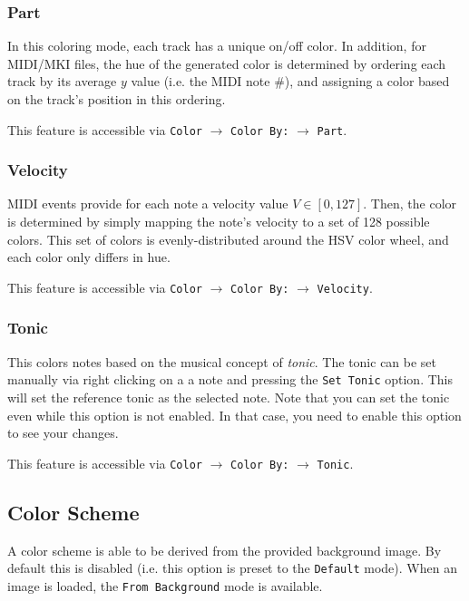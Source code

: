 \documentclass[english]{article}
\providecommand{\mi}[1]{\texttt{#1}}
\begin{document}
\vspace{1em}

\subsubsection{Part}

In this coloring mode, each track has a unique on/off color. In addition, for MIDI/MKI files, the hue of the generated
color is determined by ordering each track by its average $y$ value (i.e. the MIDI note \#), and assigning
a color based on the track's position in this ordering.

This feature is accessible via 
\mi{Color} $\rightarrow$ \mi{Color By:} $\rightarrow$ \mi{Part}.

\subsubsection{Velocity}

MIDI events provide for each note a velocity value $V \in [0, 127]$. Then, the color is determined by simply mapping 
the note's velocity to a set of 128 possible colors. This set of colors is evenly-distributed around
the HSV color wheel, and each color only differs in hue.

This feature is accessible via 
\mi{Color} $\rightarrow$ \mi{Color By:} $\rightarrow$ \mi{Velocity}.

\subsubsection{Tonic}

This colors notes based on the musical concept of \textit{tonic}. The tonic can be set manually via right clicking on a
a note and pressing the \mi{Set Tonic} option. This will set the reference tonic as the selected note. Note that you 
can set the tonic even while this option is not enabled. In that case, you need to enable this option to see your changes.

This feature is accessible via 
\mi{Color} $\rightarrow$ \mi{Color By:} $\rightarrow$ \mi{Tonic}.

\subsection{Color Scheme}

A color scheme is able to be derived from the provided background image. By default this is disabled (i.e.
this option is preset to the \mi{Default} mode). When an image is loaded, the \mi{From Background} mode is available.
\end{document}
